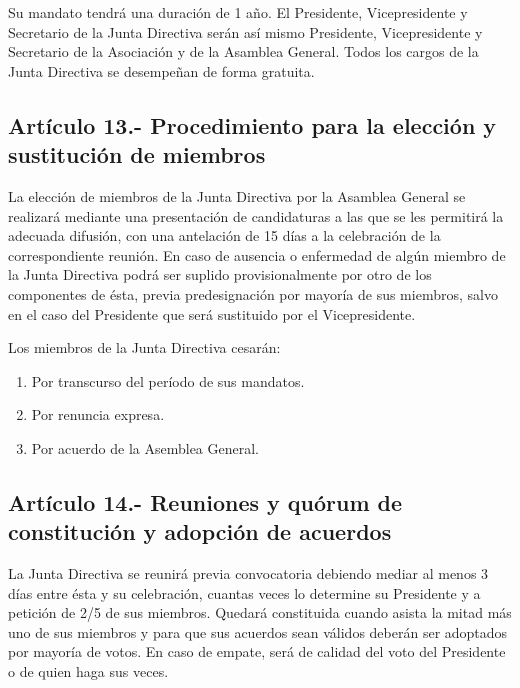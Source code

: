 \documentclass[10pt, spanish, pdftex]{gulplantilla}
\begin{document}
Su mandato tendrá una duración de 1 año. El Presidente, Vicepresidente y Secretario de la Junta Directiva serán así mismo Presidente, Vicepresidente y Secretario de la Asociación y de la Asamblea General. Todos los cargos de la Junta Directiva se desempeñan de forma gratuita.

\subsection{Artículo 13.- Procedimiento para la elección y sustitución de miembros}
La elección de miembros de la Junta Directiva por la Asamblea General se realizará mediante una presentación de candidaturas a las que se les permitirá la adecuada difusión, con una antelación de 15 días a la celebración de la correspondiente reunión. En caso de ausencia o enfermedad de algún miembro de la Junta Directiva podrá ser suplido provisionalmente por otro de los componentes de ésta, previa predesignación por mayoría de sus miembros, salvo en el caso del Presidente que será sustituido por el Vicepresidente.

Los miembros de la Junta Directiva cesarán:
\begin{enumerate}[label=\alph*)]
    \item Por transcurso del período de sus mandatos.
    \item Por renuncia expresa.
    \item Por acuerdo de la Asemblea General.
\end{enumerate}

\subsection{Artículo 14.- Reuniones y quórum de constitución y adopción de acuerdos}
La Junta Directiva se reunirá previa convocatoria debiendo mediar al menos 3 días entre ésta y su celebración, cuantas veces lo determine su Presidente y a petición de 2/5 de sus miembros. Quedará constituida cuando asista la mitad más uno de sus miembros y para que sus acuerdos sean válidos deberán ser adoptados por mayoría de votos. En caso de empate, será de calidad del voto del Presidente o de quien haga sus veces.
\end{document}
